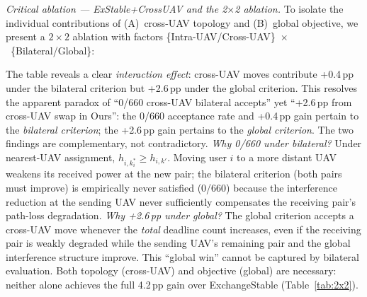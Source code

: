 \documentclass[journal]{IEEEtran}
\begin{document}
\emph{Critical ablation --- ExStable+CrossUAV and the 2$\times$2 ablation.}
To isolate the individual contributions of (A)~cross-UAV topology and (B)~global objective, we present a $2\!\times\!2$ ablation with factors \{Intra-UAV/Cross-UAV\}~$\times$~\{Bilateral/Global\}:

\begin{table}[h]
\centering
\caption{$2\!\times\!2$ Ablation: Topology $\times$ Acceptance Criterion ($K\!=\!2$, $N\!=\!20$, 20 seeds)}
\label{tab:2x2}
\footnotesize
{}
\end{table}

\noindent The table reveals a clear \emph{interaction effect}: cross-UAV moves contribute +0.4\,pp under the bilateral criterion but +2.6\,pp under the global criterion.
This resolves the apparent paradox of ``0/660 cross-UAV bilateral accepts'' yet ``+2.6\,pp from cross-UAV swap in Ours'':
the 0/660 acceptance rate and +0.4\,pp gain pertain to the \emph{bilateral criterion}; the +2.6\,pp gain pertains to the \emph{global criterion}.
The two findings are complementary, not contradictory.
\emph{Why 0/660 under bilateral?}
Under nearest-UAV assignment, $h_{i,k_i^*} \geq h_{i,k'}$.
Moving user $i$ to a more distant UAV weakens its received power at the new pair; the bilateral criterion (both pairs must improve) is empirically never satisfied (0/660) because the interference reduction at the sending UAV never sufficiently compensates the receiving pair's path-loss degradation.
\emph{Why +2.6\,pp under global?}
The global criterion accepts a cross-UAV move whenever the \emph{total} deadline count increases, even if the receiving pair is weakly degraded while the sending UAV's remaining pair and the global interference structure improve.
This ``global win'' cannot be captured by bilateral evaluation.
Both topology (cross-UAV) and objective (global) are necessary: neither alone achieves the full 4.2\,pp gain over ExchangeStable (Table~\ref{tab:2x2}).
\end{document}
